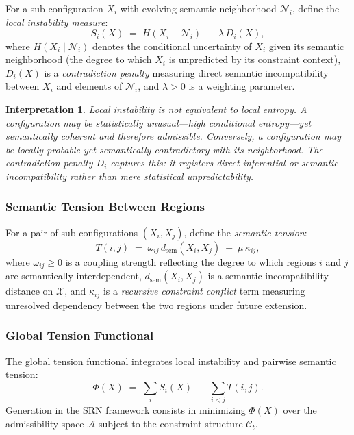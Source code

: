 \documentclass[11pt, a4paper]{article}
\theoremstyle{srn}
\theoremstyle{srnremark}
\newtheorem{interpretation}{Interpretation}[section]
\newcommand{\Aspace}{\mathcal{A}}           %
\newcommand{\Cstruct}{\mathcal{C}}           %
\newcommand{\Nhd}{\mathcal{N}}           %
\newcommand{\Phiten}{\varPhi}            %
\newcommand{\dsem}{d_{\mathrm{sem}}}  %
\begin{document}
For a sub-configuration $X_i$ with evolving semantic neighborhood
$\Nhd_i$, define the \emph{local instability measure}:
\[
  S_i(X)
  \;=\;
  H\!\left(X_i \,\middle|\, \Nhd_i\right)
  \;+\;
  \lambda\, D_i(X),
\]
where $H(X_i \mid \Nhd_i)$ denotes the conditional uncertainty of $X_i$
given its semantic neighborhood (the degree to which $X_i$ is
unpredicted by its constraint context), $D_i(X)$ is a
\emph{contradiction penalty} measuring direct semantic incompatibility
between $X_i$ and elements of $\Nhd_i$, and $\lambda > 0$ is a
weighting parameter.

\begin{interpretation}
Local instability is not equivalent to local entropy.
A configuration may be statistically unusual---high conditional
entropy---yet semantically coherent and therefore admissible.
Conversely, a configuration may be locally probable yet semantically
contradictory with its neighborhood.
The contradiction penalty $D_i$ captures this: it registers direct
inferential or semantic incompatibility rather than mere statistical
unpredictability.
\end{interpretation}

\subsubsection*{Semantic Tension Between Regions}

For a pair of sub-configurations $(X_i, X_j)$, define the
\emph{semantic tension}:
\[
  T(i,j)
  \;=\;
  \omega_{ij}\, \dsem(X_i, X_j)
  \;+\;
  \mu\, \kappa_{ij},
\]
where $\omega_{ij} \geq 0$ is a coupling strength reflecting the
degree to which regions $i$ and $j$ are semantically interdependent,
$\dsem(X_i, X_j)$ is a semantic incompatibility distance on
$\mathcal{X}$, and $\kappa_{ij}$ is a \emph{recursive constraint
conflict} term measuring unresolved dependency between the two regions
under future extension.

\subsubsection*{Global Tension Functional}

The global tension functional integrates local instability and pairwise
semantic tension:
\[
  \Phiten(X)
  \;=\;
  \sum_{i} S_i(X)
  \;+\;
  \sum_{i < j} T(i,j).
\]
Generation in the SRN framework consists in minimizing $\Phiten(X)$
over the admissibility space $\Aspace$ subject to the constraint structure
$\Cstruct_t$.
\end{document}
